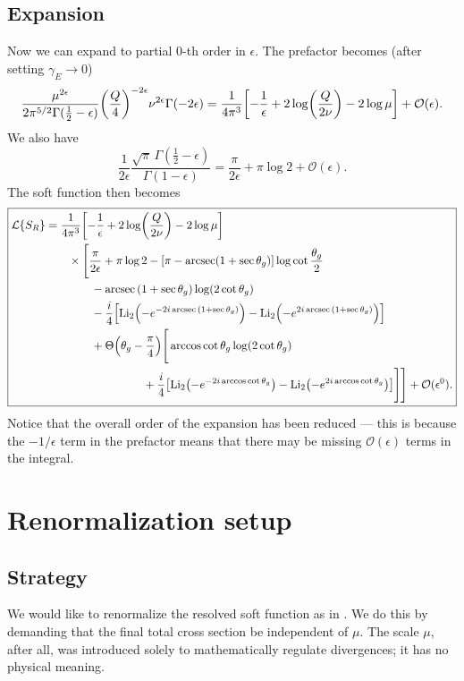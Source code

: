 \documentclass[11pt,twoside,reqno]{amsart}
\theoremstyle{plain}
\theoremstyle{remark}
\theoremstyle{definition}
\theoremstyle{remark}
\theoremstyle{definition}
\theoremstyle{definition}
\newcommand{\cL}{\mathcal{L}}
\newcommand{\cO}{\mathcal{O}}
\newcommand{\Li}{\mathrm{Li}}
\begin{document}
\subsection{Expansion}
	Now we can expand to partial $0$-th order in $\epsilon$. The prefactor becomes (after setting $\gamma_E \to 0$)
	\begin{equation}
		\frac{\mu^{2\epsilon}}{2\pi^{5/2} \Gamma(\frac{1}{2} - \epsilon)}\qty(\frac{Q}{4})^{-2\epsilon} \nu^{2\epsilon} \Gamma(-2\epsilon) = \frac{1}{4\pi^3}\qty[-\frac{1}{\epsilon} + 2\log(\frac{Q}{2\nu}) - 2\log\mu] + \cO(\epsilon).
	\end{equation}
	We also have
	\begin{equation}
		\frac{1}{2\epsilon}\frac{\sqrt{\pi} \, \Gamma(\frac{1}{2} - \epsilon)}{\Gamma(1 - \epsilon)} = \frac{\pi}{2\epsilon} + \pi \log 2 + \cO(\epsilon).
	\end{equation}
	The soft function then becomes
	\begin{equation}\label{eq:transformed soft function partial order}
	\boxed{
	\begin{aligned}
		\cL\qty{S_R} &= \frac{1}{4\pi^3}\qty[-\frac{1}{\epsilon} + 2\log(\frac{Q}{2\nu}) - 2\log\mu] \\
			&\qquad\times \Bigg[\frac{\pi}{2\epsilon} + \pi \log 2 - \qty[\pi - \arcsec(1 + \sec\theta_g)]\log\cot\frac{\theta_g}{2} \\
			&\qquad\qquad - \arcsec\qty(1 + \sec\theta_g) \log(2\cot\theta_g) \\
			&\qquad\qquad - \frac{i}{4}\qty[\Li_2\qty(-e^{-2i\arcsec\qty(1 + \sec\theta_g)}) - \Li_2\qty(-e^{2i\arcsec\qty(1 + \sec\theta_g)})] \\
			&\qquad\qquad+ \Theta\qty(\theta_g - \frac{\pi}{4})\Bigg[ \arccos\cot\theta_g \log(2\cot\theta_g) \\
			&\hspace{3cm}+ \frac{i}{4}\qty[\Li_2\qty(-e^{-2i\arccos\cot\theta_g}) - \Li_2\qty(-e^{2i\arccos\cot\theta_g})] \Bigg] \Bigg] + \cO(\epsilon^0).
	\end{aligned}
	}
	\end{equation}
	Notice that the overall order of the expansion has been reduced --- this is because the $-1/\epsilon$ term in the prefactor means that there may be missing $\cO(\epsilon)$ terms in the integral.

\section{Renormalization setup}
\subsection{Strategy}
	We would like to renormalize the resolved soft function as in \cite{frye_factorization_2016}. We do this by demanding that the final total cross section be independent of $\mu$. The scale $\mu$, after all, was introduced solely to mathematically regulate divergences; it has no physical meaning.
\end{document}
